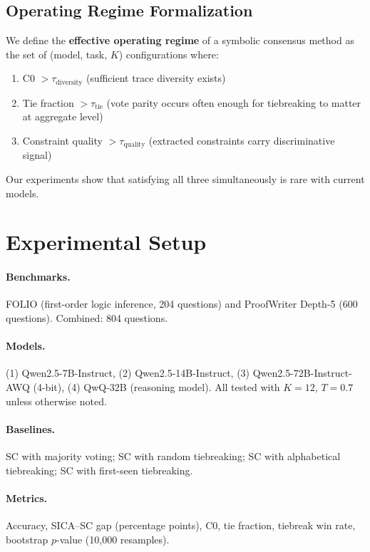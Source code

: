 \documentclass[11pt]{article}
\begin{document}
\subsection{Operating Regime Formalization}

We define the \textbf{effective operating regime} of a symbolic consensus method as the set of (model, task, $K$) configurations where:
\begin{enumerate}
    \item C0 $> \tau_{\text{diversity}}$ (sufficient trace diversity exists)
    \item Tie fraction $> \tau_{\text{tie}}$ (vote parity occurs often enough for tiebreaking to matter at aggregate level)
    \item Constraint quality $> \tau_{\text{quality}}$ (extracted constraints carry discriminative signal)
\end{enumerate}
Our experiments show that satisfying all three simultaneously is rare with current models.

\section{Experimental Setup}

\paragraph{Benchmarks.} FOLIO (first-order logic inference, 204 questions) and ProofWriter Depth-5 (600 questions). Combined: 804 questions.

\paragraph{Models.} (1) Qwen2.5-7B-Instruct, (2) Qwen2.5-14B-Instruct, (3) Qwen2.5-72B-Instruct-AWQ (4-bit), (4) QwQ-32B (reasoning model). All tested with $K=12$, $T=0.7$ unless otherwise noted.

\paragraph{Baselines.} SC with majority voting; SC with random tiebreaking; SC with alphabetical tiebreaking; SC with first-seen tiebreaking.

\paragraph{Metrics.} Accuracy, SICA--SC gap (percentage points), C0, tie fraction, tiebreak win rate, bootstrap $p$-value (10,000 resamples).
\end{document}
